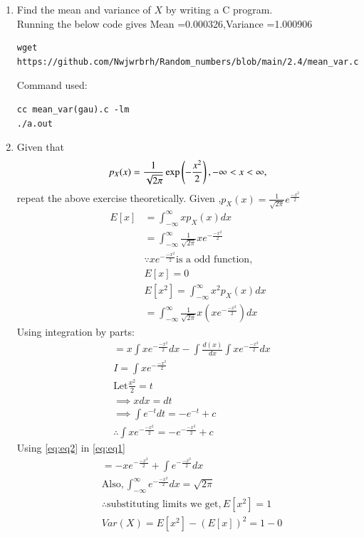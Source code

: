 \documentclass[journal,12pt,twocolumn]{IEEEtran}
\renewcommand\thesection{\arabic{section}}
\begin{document}
\begin{enumerate}[label=\thesection.\arabic*
,ref=\thesection.\theenumi]
\item Find the mean and variance of $X$ by writing a C program.\\
\solution
Running the below code gives Mean =0.000326,Variance =1.000906
 \begin{lstlisting}
wget https://github.com/Nwjwrbrh/Random_numbers/blob/main/2.4/mean_var.c
\end{lstlisting}
Command used:
\begin{lstlisting}
cc mean_var(gau).c -lm
./a.out
\end{lstlisting}
\item Given that 
\begin{align}
p_{X}(x) = \frac{1}{\sqrt{2\pi}}\exp\left(-\frac{x^2}{2}\right), -\infty < x < \infty,
\end{align}
repeat the above exercise theoretically.
%
\solution Given ,$p_{X}(x)=\frac{1}{\sqrt{2\pi}} e^{\frac{-x^2}{2}}$\\
\begin{align}
E[x]&=\int_{-\infty}^{\infty} x p_{X}(x) dx\\
 &=\int_{-\infty}^{\infty} \frac{1}{\sqrt{2 \pi}} x e^{-\frac{-x^2}{2}}\\
  &\because x e^{-\frac{-x^2}{2}} \text{is a odd function},\\
  \nonumber
   &E[x]=0\\
 &E[x^2]=\int_{-\infty}^{\infty} x^2 p_{X}(x) dx\\
 &=\int_{-\infty}^{\infty} \frac{1}{\sqrt{2\pi}} x(xe^{-\frac{-x^2}{2}}) dx
 \end{align}
  Using integration by parts:
  \begin{align}
   \label{eq:eq1}
 & =x\int xe^{-\frac{-x^2}{2}} dx-\int\frac{d(x)}{dx} \int xe^{-\frac{-x^2}{2}}dx\\
 &I=\int x e^{-\frac{-x^2}{2}}\\
 &\text{Let} \frac{x^2}{2}=t \\
 &\implies x dx=dt\\
 &\implies \int e^{-t} dt=-e^{-t} +c\\
 \label{eq:eq2}
 &\therefore \int x e^{-\frac{-x^2}{2}}=-e^{-\frac{-x^2}{2}} +c
 \end{align}
 Using \eqref{eq:eq2} in \eqref{eq:eq1}\\
 \begin{align}
&= -x e^{-\frac{-x^2}{2}}+\int e^{-\frac{-x^2}{2}} dx\\
&\text{Also} ,\int_{-\infty}^{\infty} e^{-\frac{-x^2}{2}} dx=\sqrt{2 \pi} \\
&\therefore \text{substituting limits we get}, E[x^2]=1\\
 &Var(X)=E[x^2]-(E[x])^2=1-0
 \end{align}
 \end{enumerate}
\end{document}
